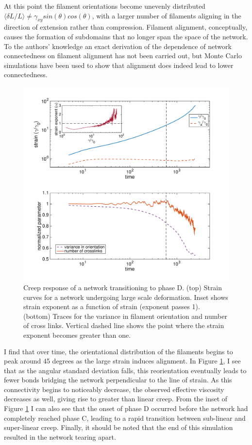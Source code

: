 At this point the filament orientations become unevenly distributed $\langle \delta L / L \rangle \neq \gamma_{xy}sin(\theta)cos(\theta)$, with a larger number of filaments aligning in the direction of extension rather than compression.  Filament alignment, conceptually, causes the formation of subdomains that no longer span the space of the network. To the authors' knowledge an exact derivation of the dependence of network connectedness on filament alignment has not been carried out, but Monte Carlo simulations have been used to show that alignment does indeed lead to lower connectedness\cite{model_percolationanisotropy}.

\begin{figure}[h!]
\centering
\includegraphics[width=\hsize]{slippage/tearer}
\caption[Creep response of a network transitioning to phase D.]{\label{fig:tearer} Creep response of a network transitioning to phase D. (top)  Strain curves for a network undergoing large scale deformation.  Inset shows strain exponent as a function of strain (exponent passes 1).  (bottom)  Traces for the variance in filament orientation and number of cross links.  Vertical dashed line shows the point where the strain exponent becomes greater than one.}
\end{figure}

I find that over time, the orientational distribution of the filaments begins to peak around 45 degrees as the large strain induces alignment.  In Figure \ref{fig:tearer}, I see that as the angular standard deviation falls, this reorientation eventually leads to fewer bonds bridging the network perpendicular to the line of strain.  As this connectivity begins to noticeably decrease, the observed effective viscosity decreases as well, giving rise to greater than linear creep.  From the inset of Figure \ref{fig:tearer} I can also see that the onset of phase D occurred before the network had completely reached phase C, leading to a rapid transition between sub-linear and super-linear creep.  Finally, it should be noted that the end of this simulation resulted in the network tearing apart.  



